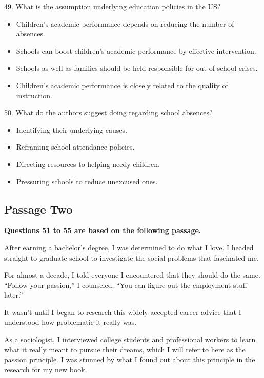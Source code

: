 \documentclass[UTF8,11pt]{ctexart}
\begin{document}
49. What is the assumption underlying education policies in the US?


\begin{itemize}[leftmargin=2em,itemsep=.2em,topsep=.4em]\item[A.] Children’s academic performance depends on reducing the number of absences.
\item[B.] Schools can boost children’s academic performance by effective intervention.
\item[C.] Schools as well as families should be held responsible for out-of-school crises.
\item[D.] Children’s academic performance is closely related to the quality of instruction.
\end{itemize}

50. What do the authors suggest doing regarding school absences?


\begin{itemize}[leftmargin=2em,itemsep=.2em,topsep=.4em]\item[A.] Identifying their underlying causes.
\item[B.] Reframing school attendance policies.
\item[C.] Directing resources to helping needy children.
\item[D.] Pressuring schools to reduce unexcused ones.
\end{itemize}

\subsection*{\textbf{Passage Two}}


\textbf{Questions 51 to 55 are based on the following passage.}


After earning a bachelor’s degree, I was determined to do what I love. I headed straight to graduate school to investigate the social problems that fascinated me.


For almost a decade, I told everyone I encountered that they should do the same. “Follow your passion,” I counseled. “You can figure out the employment stuff later.”


It wasn’t until I began to research this widely accepted career advice that I understood how problematic it really was.


As a sociologist, I interviewed college students and professional workers to learn what it really meant to pursue their dreams, which I will refer to here as the passion principle. I was stunned by what I found out about this principle in the research for my new book.
\end{document}
